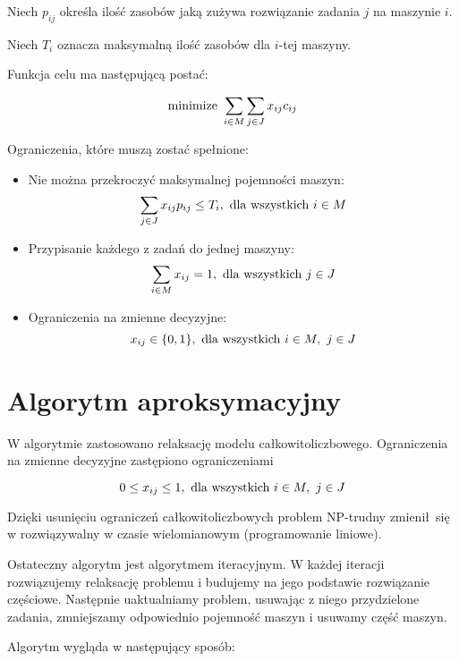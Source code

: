 \documentclass{article}
\begin{document}
    Niech $p_{ij}$ określa ilość zasobów jaką zużywa rozwiązanie zadania $j$ na maszynie $i$.

    Niech $T_i$ oznacza maksymalną ilość zasobów dla $i$-tej maszyny.

    Funkcja celu ma następującą postać:

    $$\textnormal{minimize } \sum_{i \in M} \sum_{j \in J} x_{ij} c_{ij}$$

    Ograniczenia, które muszą zostać spełnione:
    \begin{itemize}
        \item Nie można przekroczyć maksymalnej pojemności maszyn:
            $$\sum_{j \in J} x_{ij} p_{ij} \leq T_i, \ \textnormal{dla wszystkich } i \in M$$
        \item Przypisanie każdego z zadań do jednej maszyny:
            $$\sum_{i \in M} x_{ij} = 1, \ \textnormal{dla wszystkich } j \in J$$
        \item Ograniczenia na zmienne decyzyjne:
            $$x_{ij} \in \{0, 1\}, \ \textnormal{dla wszystkich } i \in M, \ j \in J$$
    \end{itemize}

    \section{Algorytm aproksymacyjny}

    W algorytmie zastosowano relaksację modelu całkowitoliczbowego. Ograniczenia na zmienne decyzyjne zastępiono ograniczeniami 
    
    $$0 \leq x_{ij} \leq 1, \ \textnormal{dla wszystkich } i \in M, \ j \in J$$

    Dzięki usunięciu ograniczeń całkowitoliczbowych problem NP-trudny zmienił się w rozwiązywalny w czasie wielomianowym (programowanie liniowe). 

    Ostateczny algorytm jest algorytmem iteracyjnym. W każdej iteracji rozwiązujemy relaksację problemu i budujemy na jego podstawie 
    rozwiązanie częściowe. Następnie uaktualniamy problem, usuwając z niego przydzielone zadania, zmniejszamy odpowiednio pojemność maszyn 
    i usuwamy część maszyn.

    Algorytm wygląda w następujący sposób:
\end{document}
